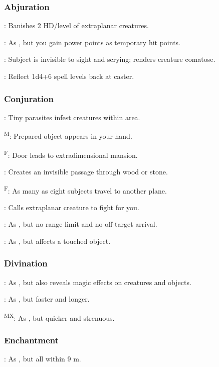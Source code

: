 \subsubsection{Abjuration}
	: Banishes 2 HD/level of extraplanar creatures.

	: As , but you gain power points as temporary hit points.

	: Subject is invisible to sight and scrying; renders creature comatose.

	: Reflect 1d4+6 spell levels back at caster.

\subsubsection{Conjuration}
	: Tiny parasites infest creatures within area. %

	\textsuperscript{M}: Prepared object appears in your hand.

	\textsuperscript{F}: Door leads to extradimensional mansion.

	: Creates an invisible passage through wood or stone.

	\textsuperscript{F}: As many as eight subjects travel to another plane.

	: Calls extraplanar creature to fight for you.

	: As , but no range limit and no off-target arrival.

	: As , but affects a touched object.

\subsubsection{Divination}
	: As , but also reveals magic effects on creatures and objects.

	: As , but faster and longer.

	\textsuperscript{MX}: As , but quicker and strenuous.

\subsubsection{Enchantment}
	: As , but all within 9 m.

